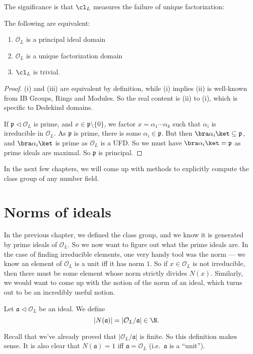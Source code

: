 \documentclass[a4paper]{article}
\begin{document}
The significance is that $\cl_L$ measures the failure of unique factorization:
\begin{thm}
  The following are equivalent:
  \begin{enumerate}
    \item $\mathcal{O}_L$ is a principal ideal domain
    \item $\mathcal{O}_L$ is a unique factorization domain
    \item $\cl_L$ is trivial.
  \end{enumerate}
\end{thm}
\begin{proof}
  (i) and (iii) are equivalent by definition, while (i) implies (ii) is well-known from IB Groups, Rings and Modules. So the real content is (ii) to (i), which is specific to Dedekind domains.

  If $\mathfrak{p} \lhd \mathcal{O}_L$ is prime, and $x \in \mathfrak{p} \setminus \{0\}$, we factor $x = \alpha_1 \cdots \alpha_k$ such that $\alpha_i$ is irreducible in $\mathcal{O}_L$. As $\mathfrak{p}$ is prime, there is some $\alpha_i \in \mathfrak{p}$. But then $\bra \alpha_i\ket \subseteq \mathfrak{p}$, and $\bra \alpha_i\ket$ is prime as $\mathcal{O}_L$ is a UFD. So we must have $\bra \alpha_i\ket = \mathfrak{p}$ as prime ideals are maximal. So $\mathfrak{p}$ is principal.
\end{proof}

In the next few chapters, we will come up with methods to explicitly compute the class group of any number field.

\section{Norms of ideals}
In the previous chapter, we defined the class group, and we know it is generated by prime ideals of $\mathcal{O}_L$. So we now want to figure out what the prime ideals are. In the case of finding irreducible elements, one very handy tool was the norm --- we know an element of $\mathcal{O}_L$ is a unit iff it has norm $1$. So if $x \in \mathcal{O}_L$ is not irreducible, then there must be some element whose norm strictly divides $N(x)$. Similarly, we would want to come up with the notion of the norm of an ideal, which turns out to be an incredibly useful notion.

\begin{defi}
  Let $\mathfrak{a} \lhd \mathcal{O}_L$ be an ideal. We define
  \[
    |N(\mathfrak{a})| = |\mathcal{O}_L/\mathfrak{a}| \in \N.
  \]
\end{defi}
Recall that we've already proved that $|\mathcal{O}_L/\mathfrak{a}|$ is finite. So this definition makes sense. It is also clear that $N(\mathfrak{a}) = 1$ iff $\mathfrak{a} = \mathcal{O}_L$ (i.e.\ $\mathfrak{a}$ is a ``unit'').
\end{document}
